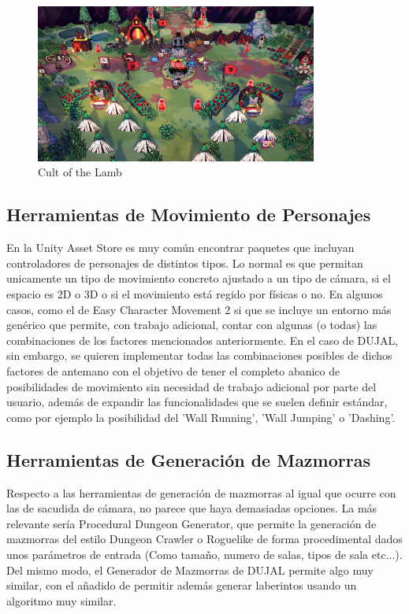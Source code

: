 \begin{figure}[H]
    \centering
    \includegraphics[width=350px,clip=true]{cult_of_the_lamb.png}
    \caption{Cult of the Lamb}
    \label{fig:clamb}
\end{figure}

\subsection{Herramientas de Movimiento de Personajes}
En la Unity Asset Store\cite{unityAssetStore} es muy común encontrar paquetes que incluyan controladores de personajes de distintos tipos. Lo normal es que permitan unicamente un tipo de movimiento concreto ajustado
 a un tipo de cámara, si el espacio es 2D o 3D o si el movimiento está regido por físicas o no. En algunos casos, como el de Easy Character Movement 2\cite{ECM2} si que se incluye un entorno más genérico que permite,
 con trabajo adicional, contar con algunas (o todas) las combinaciones de los factores mencionados anteriormente. En el caso de DUJAL, sin embargo, se quieren implementar todas las combinaciones posibles de dichos 
 factores de antemano con el objetivo de tener el completo abanico de posibilidades de movimiento sin necesidad de trabajo adicional por parte del usuario, además de expandir las funcionalidades que se suelen 
 definir estándar, como por ejemplo la posibilidad del 'Wall Running'\cite{wallRun}, 'Wall Jumping'\cite{wallJump} o 'Dashing'\cite{dash}.

\subsection{Herramientas de Generación de Mazmorras}
Respecto a las herramientas de generación de mazmorras al igual que ocurre con las de sacudida de cámara, no parece que haya demasiadas opciones. La más relevante sería Procedural Dungeon 
Generator\cite{ProceduralDunGen}, que permite la generación de mazmorras del estilo Dungeon Crawler o Roguelike de forma procedimental dados unos parámetros de entrada (Como tamaño, numero de salas, tipos de sala etc...).
Del mismo modo, el Generador de Mazmorras de DUJAL permite algo muy similar, con el añadido de permitir además generar laberintos usando un algoritmo muy similar.

